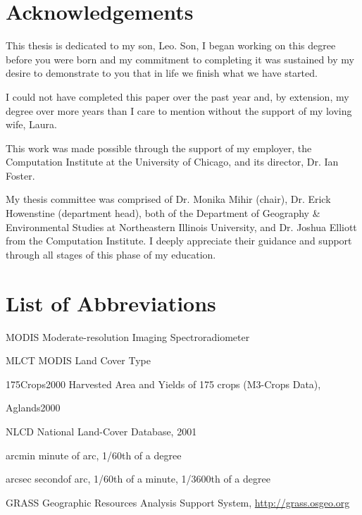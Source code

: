 \documentclass[draftthesis]{neiuthesis}
\begin{document}
\chapter*{Acknowledgements}

This thesis is dedicated to my son, Leo.  Son, I began working on this
degree before you were born and my commitment to completing it was
sustained by my desire to demonstrate to you that in life we finish
what we have started.

I could not have completed this paper over the past year and, by
extension, my degree over more years than I care to mention without the
support of my loving wife, Laura.

This work was made possible through the support of my
employer, the Computation Institute at the University of Chicago, and its
director, Dr. Ian Foster.  

My thesis committee was comprised of Dr. Monika Mihir (chair),
Dr. Erick Howenstine (department head), both of the Department of
Geography \& Environmental Studies at Northeastern Illinois
University, and Dr. Joshua Elliott from the Computation Institute.  I
deeply appreciate their guidance and support through all stages of
this phase of my education.


\tableofcontents 
\listoftables
\listoffigures

\chapter{List of Abbreviations}

\begin{symbollist*}
\item[MODIS] Moderate-resolution Imaging Spectroradiometer
\item[MLCT] MODIS Land Cover Type \citep{MLCT}
\item[175Crops2000] Harvested Area and Yields of 175 crops (M3-Crops
  Data), \citep{Monfreda2008}
\item[Aglands2000] \citep{Ramankutty2008}
\item[NLCD] National Land-Cover Database, 2001 \citep{Homer2004}
\item[arcmin] minute of arc, 1/60th of a degree
\item[arcsec] secondof arc, 1/60th of a minute, 1/3600th of a degree
\item[GRASS] Geographic Resources Analysis Support System, \url{http://grass.osgeo.org}

\end{symbollist*}
\end{document}
